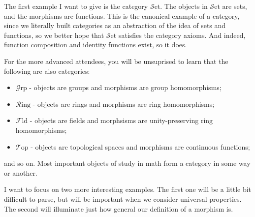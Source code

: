 \documentclass[11pt, letterpaper]{article}
\newcommand{\Set}{\mathcal{S}\mathrm{et}}
\newcommand{\Grp}{\mathcal{G}\mathrm{rp}}
\newcommand{\Ring}{\mathcal{R}\mathrm{ing}}
\newcommand{\Top}{\mathcal{T}\mathrm{op}}
\newcommand{\Fld}{\mathcal{F}\mathrm{ld}}
\begin{document}
The first example I want to give is the category $\Set $. The objects in $\Set $ are sets, and the morphisms are functions. This is the canonical example of a category, since we literally built categories as an abstraction of the idea of sets and functions, so we better hope that $\Set $ satisfies the category axioms. And indeed, function composition and identity functions exist, so it does.

For the more advanced attendees, you will be unsuprised to learn that the following are also categories:
\begin{itemize}
	\item $\Grp $ - objects are groups and morphisms are group homomorphisms;
	\item $\Ring $ - objects are rings and morphisms are ring homomorphisms;
	\item $\Fld$ - objects are fields and morphsisms are unity-preserving ring homomorphisms;
	\item $\Top $ - objects are topological spaces and morphisms are continuous functions;
\end{itemize}
and so on. Most important objects of study in math form a category in some way or another.

I want to focus on two more interesting examples. The first one will be a little bit difficult to parse, but will be important when we consider universal properties. The second will illuminate just how general our definition of a morphism is.
\end{document}

